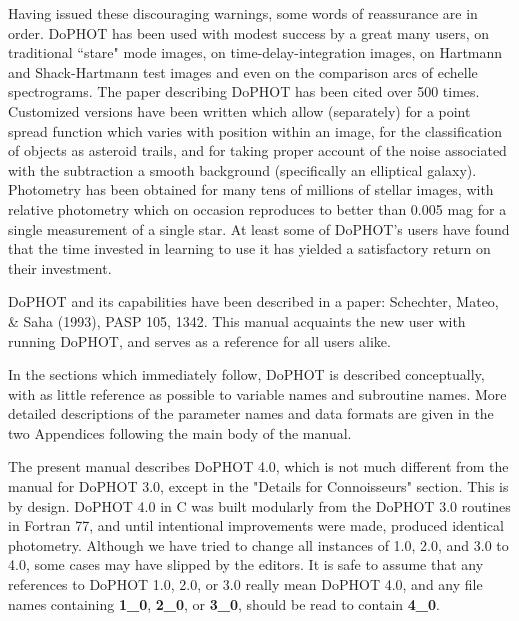 Having issued these discouraging warnings, some words of
reassurance are in order.  DoPHOT has been used with modest
success by a great many users, on traditional ``stare" mode
images, on time-delay-integration images, on Hartmann and 
Shack-Hartmann test images and even on the comparison arcs of 
echelle spectrograms.  The paper describing DoPHOT has been cited 
over 500 times.  Customized versions have been written which
allow (separately) for a point spread function which varies
with position within an image, for the classification of
objects as asteroid trails, and for taking proper account
of the noise associated with the subtraction a smooth
background (specifically an elliptical galaxy).  Photometry
has been obtained for many tens of millions of stellar images, with
relative photometry which on occasion reproduces to better
than 0.005 mag for a single measurement of a single star. At
least some of DoPHOT's users have found that the time
invested in learning to use it has yielded a satisfactory
return on their investment.

DoPHOT and its capabilities have been described in a paper: Schechter, Mateo,
\& Saha (1993), PASP 105, 1342. This manual acquaints the new user with 
running DoPHOT, and serves as a reference for all users alike. 
 
In the sections which immediately follow, DoPHOT is
described conceptually, with as little reference as possible
to variable names and subroutine names.  More detailed descriptions
of the parameter names and data formats are given in the two
Appendices following the main body of the manual.

The present manual describes DoPHOT 4.0, which is not much different from 
the manual for DoPHOT 3.0, except in the "Details for Connoisseurs" section.
This is by design.  DoPHOT 4.0 in C was built modularly from the DoPHOT 3.0 
routines in Fortran 77, and until intentional improvements were made, 
produced identical photometry. Although we have tried to change all instances 
of 1.0, 2.0, and 3.0 to 4.0, some cases may have slipped by the editors.
It is safe to assume that any references to DoPHOT 1.0, 2.0, or 3.0 really mean 
DoPHOT 4.0, and any file names containing {\bf 1\_0}, {\bf 2\_0}, or {\bf 3\_0}, 
should be read to contain {\bf 4\_0}.




